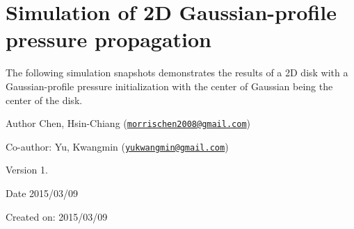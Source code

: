 \hypertarget{index_sec6}{}\section{Simulation of 2\-D Gaussian-\/profile pressure propagation}\label{index_sec6}
The following simulation snapshots demonstrates the results of a 2\-D disk with a Gaussian-\/profile pressure initialization with the center of Gaussian being the center of the disk.



\begin{DoxyAuthor}{Author}
Chen, Hsin-\/\-Chiang (\href{mailto:morrischen2008@gmail.com}{\tt morrischen2008@gmail.\-com})
\end{DoxyAuthor}
Co-\/author\-: Yu, Kwangmin (\href{mailto:yukwangmin@gmail.com}{\tt yukwangmin@gmail.\-com})

\begin{DoxyVersion}{Version}
1.
\end{DoxyVersion}
\begin{DoxyDate}{Date}
2015/03/09
\end{DoxyDate}
Created on\-: 2015/03/09 